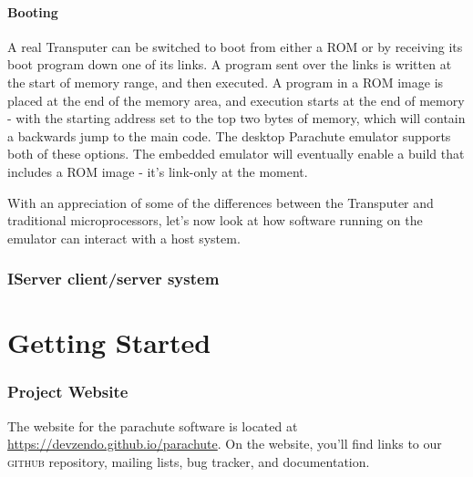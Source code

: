 \documentclass[a4paper]{tufte-book}
\newcommand{\textls}[2][5]{%
    \begingroup\addfontfeatures{LetterSpace=#1}#2\endgroup
  }
\renewcommand{\smallcapsspacing}[1]{\textls[10]{#1}}
\renewcommand{\smallcaps}[1]{\smallcapsspacing{\scshape\MakeTextLowercase{#1}}}
\renewcommand\smallcapsspacing[1]{{\addfontfeature{LetterSpace=10}#1}}
\begin{document}
\subsection{Booting}
A real Transputer can be switched to boot from either a ROM or by receiving its boot program down one of its links. A program sent over the links is written at the start of memory range, and then executed. A program in a ROM image is placed at the end of the memory area, and execution starts at the end of memory - with the starting address set to the top two bytes of memory, which will contain a backwards jump to the main code. The desktop Parachute emulator supports both of these options. The embedded emulator will eventually enable a build that includes a ROM image - it's link-only at the moment.

\vspace{5mm}

With an appreciation of some of the differences between the Transputer and traditional microprocessors, let's now look at how software running on the emulator can interact with a host system.
 
\section{IServer client/server system}






\pagebreak
\part{Getting Started}
\label{getting-started}

\section{Project Website}

The website for the parachute software is located at
\url{https://devzendo.github.io/parachute}. On the website, you'll find
links to our \smallcaps{github} repository, mailing lists, bug tracker, and documentation. 
\end{document}
